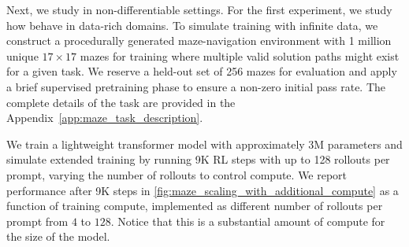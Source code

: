 \documentclass[10pt]{article} %
\begin{document}
Next, we study \ours{} in non-differentiable settings. For the first experiment, we study how \ours{} behave in data-rich domains. To simulate training with infinite data, we construct a procedurally generated maze-navigation environment with 1 million unique $17 \times 17$ mazes for training where multiple valid solution paths might exist for a given task. We reserve a held-out set of 256 mazes for evaluation and apply a brief supervised pretraining phase to ensure a non-zero initial pass rate. The complete details of the task are provided in the Appendix~\ref{app:maze_task_description}.

We train a lightweight transformer model \citep{vaswani2023attentionneed} with approximately 3M parameters and simulate extended training by running 9K RL steps with up to 128 rollouts per prompt, varying the number of rollouts to control compute. We report performance after 9K steps in \cref{fig:maze_scaling_with_additional_compute} as a function of training compute, implemented as different number of rollouts per prompt from $4$ to $128$. Notice that this is a substantial amount of compute for the size of the model.

\begin{table}
    \centering
    \vspace{-0pt}
    \caption{Performance comparison in maze with additional baselines.}
    \vspace{-4pt}
    \label{tab:maze_baseline_comparisons}
\end{table}
\end{document}
